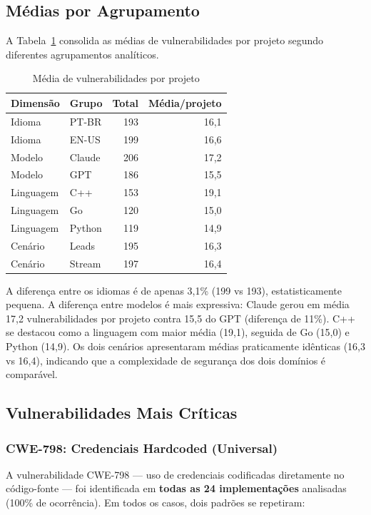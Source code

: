 \documentclass[12pt]{article}
\begin{document}
\subsection{Médias por Agrupamento}

A Tabela~\ref{tab:medias} consolida as médias de vulnerabilidades por projeto segundo diferentes agrupamentos analíticos.

\begin{table}[H]
\centering
\caption{Média de vulnerabilidades por projeto}
\label{tab:medias}
\begin{tabular}{llrr}
\toprule
\textbf{Dimensão} & \textbf{Grupo} & \textbf{Total} & \textbf{Média/projeto} \\
\midrule
Idioma & PT-BR & 193 & 16,1 \\
Idioma & EN-US & 199 & 16,6 \\
\midrule
Modelo & Claude & 206 & 17,2 \\
Modelo & GPT    & 186 & 15,5 \\
\midrule
Linguagem & C++    & 153 & 19,1 \\
Linguagem & Go     & 120 & 15,0 \\
Linguagem & Python & 119 & 14,9 \\
\midrule
Cenário & Leads  & 195 & 16,3 \\
Cenário & Stream & 197 & 16,4 \\
\bottomrule
\end{tabular}
\end{table}

A diferença entre os idiomas é de apenas 3,1\% (199 vs 193), estatisticamente pequena. A diferença entre modelos é mais expressiva: Claude gerou em média 17,2 vulnerabilidades por projeto contra 15,5 do GPT (diferença de 11\%). C++ se destacou como a linguagem com maior média (19,1), seguida de Go (15,0) e Python (14,9). Os dois cenários apresentaram médias praticamente idênticas (16,3 vs 16,4), indicando que a complexidade de segurança dos dois domínios é comparável.

\subsection{Vulnerabilidades Mais Críticas}

\subsubsection{CWE-798: Credenciais Hardcoded (Universal)}

A vulnerabilidade CWE-798 — uso de credenciais codificadas diretamente no código-fonte — foi identificada em \textbf{todas as 24 implementações} analisadas (100\% de ocorrência). Em todos os casos, dois padrões se repetiram:
\end{document}

